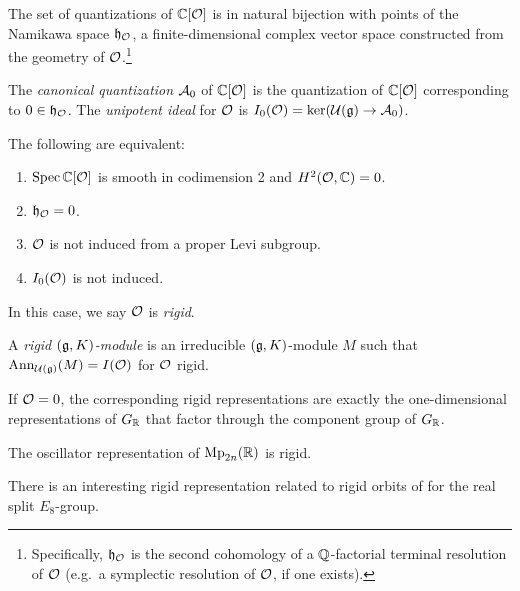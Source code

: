 \documentclass{article}
\begin{document}
\begin{thm}
	The set of quantizations of $\mathbb{C}[\mathcal{O}]$ is in natural bijection with points of the Namikawa space $\mathfrak{h}_{\mathcal{O}}$, a finite-dimensional complex vector space constructed from the geometry of $\mathcal{O}$.\footnote{Specifically, $\mathfrak{h}_{\mathcal{O}}$ is the second cohomology of a $\mathbb{Q}$-factorial terminal resolution of $\mathcal{O}$ (e.g.\ a symplectic resolution of $\mathcal{O}$, if one exists).}
\end{thm}

\begin{dfn}
	The \emph{canonical quantization} $\mathcal{A}_0$ of $\mathbb{C}[\mathcal{O}]$ is the quantization of $\mathbb{C}[\mathcal{O}]$ corresponding to $0 \in \mathfrak{h}_{\mathcal{O}}$.
	The \emph{unipotent ideal} for $\mathcal{O}$ is $I_0(\mathcal{O}) = \ker(\mathcal{U}(\mathfrak{g}) \to \mathcal{A}_0)$.
\end{dfn}

\begin{prop}
	The following are equivalent:
	\begin{enumerate}
		\item $\operatorname{Spec} \mathbb{C}[\mathcal{O}]$ is smooth in codimension 2 and $H^2(\mathcal{O}, \mathbb{C}) = 0$.
		\item $\mathfrak{h}_{\mathcal{O}} = 0$.
		\item $\mathcal{O}$ is not induced from a proper Levi subgroup.
		\item $I_0(\mathcal{O})$ is not induced.
	\end{enumerate}
\end{prop}

In this case, we say $\mathcal{O}$ is \emph{rigid}.

\begin{dfn}
	A \emph{rigid $(\mathfrak{g}, K)$-module} is an irreducible $(\mathfrak{g}, K)$-module $M$ such that $\operatorname{Ann}_{\mathcal{U}(\mathfrak{g})}(M) = I(\mathcal{O})$ for $\mathcal{O}$ rigid.
\end{dfn}

\begin{ex}
	If $\mathcal{O} = 0$, the corresponding rigid representations are exactly the one-dimensional representations of $G_{\mathbb{R}}$ that factor through the component group of $G_{\mathbb{R}}$.
\end{ex}

\begin{ex}
	The oscillator representation of $\operatorname{Mp}_{2n}(\mathbb{R})$ is rigid.
\end{ex}

\begin{ex}
	There is an interesting rigid representation related to rigid orbits of for the real split $E_8$-group.
\end{ex}
\end{document}
